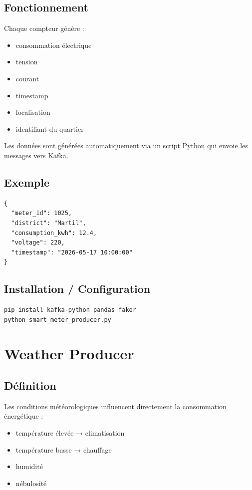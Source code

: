\documentclass[12pt,a4paper]{report}
\begin{document}
\subsection{Fonctionnement}

Chaque compteur génère :

\begin{itemize}
    \item consommation électrique
    \item tension
    \item courant
    \item timestamp
    \item localisation
    \item identifiant du quartier
\end{itemize}

Les données sont générées automatiquement via un script Python qui envoie les messages vers Kafka.

\subsection{Exemple}

\begin{verbatim}
{
  "meter_id": 1025,
  "district": "Martil",
  "consumption_kwh": 12.4,
  "voltage": 220,
  "timestamp": "2026-05-17 10:00:00"
}
\end{verbatim}

\subsection{Installation / Configuration}

\begin{verbatim}
pip install kafka-python pandas faker
python smart_meter_producer.py
\end{verbatim}

\section{Weather Producer}

\subsection{Définition}

Les conditions météorologiques influencent directement la consommation énergétique :

\begin{itemize}
    \item température élevée → climatisation
    \item température basse → chauffage
    \item humidité
    \item nébulosité
\end{itemize}
\end{document}
